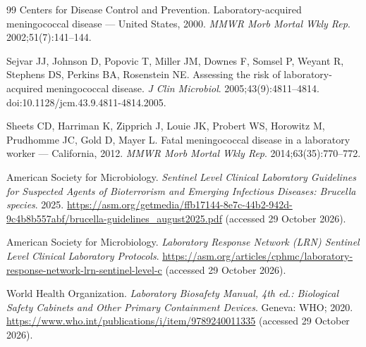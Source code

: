 \begin{thebibliography}{99}
Centers for Disease Control and Prevention. Laboratory-acquired meningococcal disease ---
United States, 2000. \textit{MMWR Morb Mortal Wkly Rep}. 2002;51(7):141--144.

Sejvar JJ, Johnson D, Popovic T, Miller JM, Downes F, Somsel P, Weyant R, Stephens DS,
Perkins BA, Rosenstein NE. Assessing the risk of laboratory-acquired meningococcal
disease. \textit{J Clin Microbiol}. 2005;43(9):4811--4814.
doi:10.1128/jcm.43.9.4811-4814.2005.

Sheets CD, Harriman K, Zipprich J, Louie JK, Probert WS, Horowitz M, Prudhomme JC, Gold D,
Mayer L. Fatal meningococcal disease in a laboratory worker --- California, 2012.
\textit{MMWR Morb Mortal Wkly Rep}. 2014;63(35):770--772.

American Society for Microbiology. \textit{Sentinel Level Clinical Laboratory Guidelines
for Suspected Agents of Bioterrorism and Emerging Infectious Diseases: Brucella species}.
2025. \url{https://asm.org/getmedia/ffb17144-8e7c-44b2-942d-9c4b8b557abf/brucella-guidelines_august2025.pdf}
(accessed 29 October 2026).

American Society for Microbiology. \textit{Laboratory Response Network (LRN) Sentinel Level
Clinical Laboratory Protocols}.
\url{https://asm.org/articles/cphmc/laboratory-response-network-lrn-sentinel-level-c}
(accessed 29 October 2026).

World Health Organization. \textit{Laboratory Biosafety Manual, 4th ed.: Biological Safety
Cabinets and Other Primary Containment Devices}. Geneva: WHO; 2020.
\url{https://www.who.int/publications/i/item/9789240011335} (accessed 29 October 2026).

\end{thebibliography}
